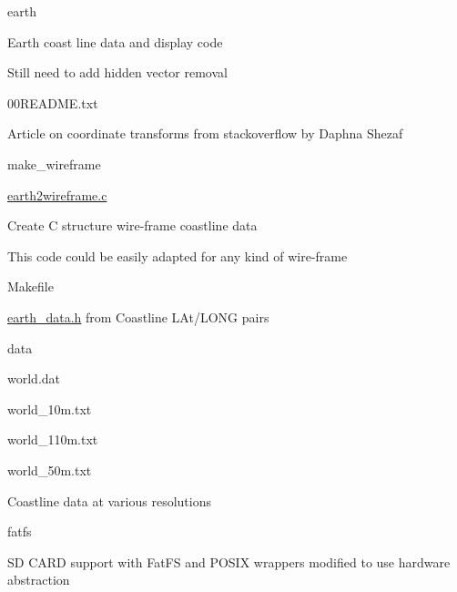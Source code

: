 \begin{DoxyItemize}
\item earth
\begin{DoxyItemize}
\item Earth coast line data and display code
\item Still need to add hidden vector removal
\begin{DoxyItemize}
\item 00\-R\-E\-A\-D\-M\-E.\-txt
\begin{DoxyItemize}
\item Article on coordinate transforms from stackoverflow by Daphna Shezaf
\end{DoxyItemize}
\item make\-\_\-wireframe
\begin{DoxyItemize}
\item \hyperlink{earth2wireframe_8c}{earth2wireframe.\-c}
\begin{DoxyItemize}
\item Create C structure wire-\/frame coastline data
\item This code could be easily adapted for any kind of wire-\/frame
\end{DoxyItemize}
\item Makefile
\begin{DoxyItemize}
\item \hyperlink{earth__data_8h}{earth\-\_\-data.\-h} from Coastline L\-At/\-L\-O\-N\-G pairs
\end{DoxyItemize}
\item data
\begin{DoxyItemize}
\item world.\-dat
\item world\-\_\-10m.\-txt
\item world\-\_\-110m.\-txt
\item world\-\_\-50m.\-txt
\begin{DoxyItemize}
\item Coastline data at various resolutions
\end{DoxyItemize}
\end{DoxyItemize}
\end{DoxyItemize}
\end{DoxyItemize}
\end{DoxyItemize}
\item fatfs
\begin{DoxyItemize}
\item S\-D C\-A\-R\-D support with Fat\-F\-S and P\-O\-S\-I\-X wrappers modified to use hardware abstraction

\end{DoxyItemize}
\end{DoxyItemize}

